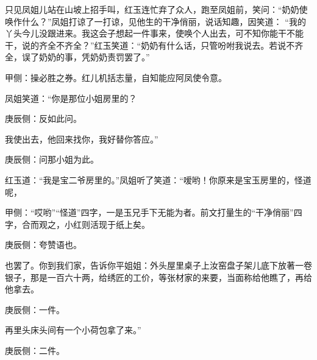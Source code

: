 \begin{parag}
    只见凤姐儿站在山坡上招手叫，红玉连忙弃了众人，跑至凤姐前，笑问：“奶奶使唤作什么？”凤姐打谅了一打谅，见他生的干净俏丽，说话知趣，因笑道： “我的丫头今儿没跟进来。我这会子想起一件事来，使唤个人出去，可不知你能干不能干，说的齐全不齐全？”红玉笑道：“奶奶有什么话，只管吩咐我说去。若说不齐全，误了奶奶的事，凭奶奶责罚罢了。”\begin{note}甲侧：操必胜之券。红儿机括志量，自知能应阿凤使令意。\end{note}凤姐笑道：“你是那位小姐房里的？\begin{note}庚辰侧：反如此问。\end{note}我使出去，他回来找你，我好替你答应。”\begin{note}庚辰侧：问那小姐为此。\end{note}红玉道：“我是宝二爷房里的。”凤姐听了笑道：“嗳哟！你原来是宝玉房里的，怪道呢，\begin{note}甲侧：“哎哟”“怪道”四字，一是玉兄手下无能为者。前文打量生的“干净俏丽”四字，合而观之，小红则活现于纸上矣。\end{note}\begin{note}庚辰侧：夸赞语也。\end{note}也罢了。你到我们家，告诉你平姐姐：外头屋里桌子上汝窑盘子架儿底下放著一卷银子，那是一百六十两，给绣匠的工价，等张材家的来要，当面称给他瞧了，再给他拿去。\begin{note}庚辰侧：一件。\end{note}再里头床头间有一个小荷包拿了来。”\begin{note}庚辰侧：二件。\end{note}
\end{parag}


